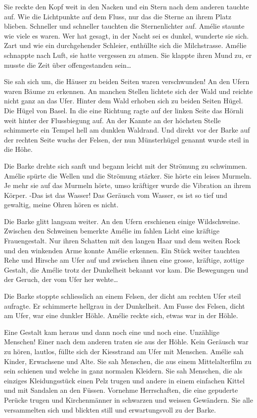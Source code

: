 \documentclass[11pt,titlepage,a5paper]{book}
\begin{document}
Sie reckte den Kopf weit in den Nacken und ein Stern nach dem anderen tauchte auf. Wie die Lichtpunkte auf dem Fluss, nur das die Sterne an ihrem Platz blieben. Schneller und schneller tauchten die Sternenlichter auf. Amélie staunte wie viele es waren. Wer hat gesagt, in der Nacht sei es dunkel, wunderte sie sich. Zart und wie ein durchgehender Schleier, enthüllte sich die Milchstrasse. Amélie schnappte nach Luft, sie hatte vergessen zu atmen. Sie klappte ihren Mund zu, er musste die Zeit über offengestanden sein\dots 

Sie sah sich um, die Häuser zu beiden Seiten waren verschwunden! An den Ufern waren Bäume zu erkennen. An manchen Stellen lichtete sich der Wald und reichte nicht ganz an das Ufer. Hinter dem Wald erhoben sich zu beiden Seiten Hügel. Die Hügel von Basel. In die eine Richtung ragte auf der linken Seite das Hörnli weit hinter der Flussbiegung auf. An der Kannte an der höchsten Stelle schimmerte ein Tempel hell am dunklen Waldrand. Und direkt vor der Barke auf der rechten Seite wuchs der Felsen, der nun Münsterhügel genannt wurde steil in die Höhe.

Die Barke drehte sich sanft und begann leicht mit der Strömung zu schwimmen. Amélie spürte die Wellen und die Strömung stärker. Sie hörte ein leises Murmeln. Je mehr sie auf das Murmeln hörte, umso kräftiger wurde die Vibration an ihrem Körper. -Das ist das Wasser! Das Geräusch vom Wasser, es ist so tief und gewaltig, meine Ohren hören es nicht. 

Die Barke glitt langsam weiter. An den Ufern erschienen einige Wildschweine. Zwischen den Schweinen bemerkte Amélie im fahlen Licht eine kräftige Frauengestalt. Nur ihren Schatten mit den langen Haar und dem weiten Rock und den winkenden Arme konnte Amélie erkennen. Ein Stück weiter tauchten Rehe und Hirsche am Ufer auf und zwischen ihnen eine grosse, kräftige, zottige Gestalt, die Amélie trotz der Dunkelheit bekannt vor kam. Die Bewegungen und der Geruch, der vom Ufer her wehte\dots 

Die Barke stoppte schliesslich an einem Felsen, der dicht am rechten Ufer steil aufragte. Er schimmerte hellgrau in der Dunkelheit. Am Fusse des Felsen, dicht am Ufer, war eine dunkler Höhle. Amélie reckte sich, etwas war in der Höhle.

Eine Gestalt kam heraus und dann noch eine und noch eine. Unzählige Menschen! Einer nach dem anderen traten sie aus der Höhle. Kein Geräusch war zu hören, lautlos, füllte sich der Kiesstrand am Ufer mit Menschen. Amélie sah Kinder, Erwachsene und Alte. Sie sah Menschen, die aus einem Mittelalterfilm zu sein schienen und welche in ganz normalen Kleidern. Sie sah Menschen, die als einziges Kleidungsstück einen Pelz trugen und andere in einem einfachen Kittel und mit Sandalen an den Füssen. Vornehme Herrschaften, die eine gepuderte Perücke trugen und Kirchenmänner in schwarzen und weissen Gewändern. Sie alle versammelten sich und blickten still und erwartungsvoll zu der Barke. 
\end{document}
